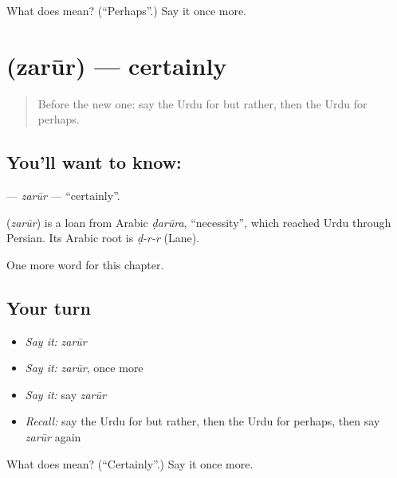 \begin{tcolorbox}[breakable,colback=teal!4,colframe=teal!35!black,title={Before you move on}]
What does  mean? (\textquotedblleft{}Perhaps\textquotedblright{}.) Say it once more.
\end{tcolorbox}
\section[\texorpdfstring{\ur{ضرور} (zarūr)}{ضرور (zarūr)}]{ (zarūr) — certainly}

\label{lesson:UR-C192-zarur}



\begin{quote}
Before the new one: say the Urdu for but rather, then the Urdu for perhaps.
\end{quote}

\subsection*{You'll want to know: }
\textbf{} — \emph{zarūr} — \textquotedblleft{}certainly\textquotedblright{}.

\begin{cousinweb}
\textbf{} (\emph{zarūr}) is a loan from Arabic \emph{ḍarūra}, \textquotedblleft{}necessity\textquotedblright{}, which reached Urdu through Persian. Its Arabic root is \emph{ḍ-r-r} (Lane).
\end{cousinweb}

\begin{grammarlens}[title={What you've built}]
One more word for this chapter.
\end{grammarlens}

\subsection*{Your turn}
\begin{itemize}
\raggedright
  \item \emph{Say it:} \emph{zarūr}
  \item \emph{Say it:} \emph{zarūr}, once more
  \item \emph{Say it:} say \emph{zarūr}
  \item \emph{Recall:} say the Urdu for but rather, then the Urdu for perhaps, then say \emph{zarūr} again
\end{itemize}

\begin{tcolorbox}[breakable,colback=teal!4,colframe=teal!35!black,title={Before you move on}]
What does  mean? (\textquotedblleft{}Certainly\textquotedblright{}.) Say it once more.
\end{tcolorbox}
